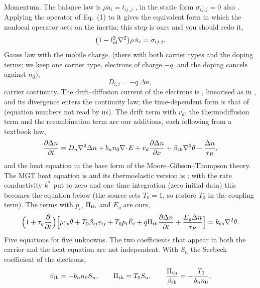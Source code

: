 \documentclass[11pt]{article}
\begin{document}
Momentum. The balance law is $\rho\ddot u_i=t_{ij,j}$ \cite[Eq.\ (3.3)]{Quintanilla2019}, in the static form $\sigma_{ij,j}=0$ also \cite[Eq.\ (4)]{Zhu2023}. Applying the operator of Eq.~(1) to it gives the equivalent form in which the nonlocal operator acts on the inertia; this step is ours and you should redo it,
\begin{equation}
\bigl(1-l_{\rm nl}^2\nabla^2\bigr)\rho\,\ddot u_i=\sigma_{ij,j},
\end{equation}
Gauss law with the mobile charge, \cite[Eqs.\ (4)--(6)]{Zhu2023} (there with both carrier types and the doping terms; we keep one carrier type, electrons of charge $-q$, and the doping cancels against $n_0$),
\begin{equation}
D_{i,i}=-q\,\Delta n ,
\end{equation}
carrier continuity. The drift--diffusion current of the electrons is \cite[Eq.\ (3)]{Zhu2023}, linearised as in \cite[Eq.\ (7)]{Zhu2023}, and its divergence enters the continuity law; the time-dependent form is that of \cite{YangZhou2005} (equation numbers not read by us). The drift term with $v_d$, the thermodiffusion term and the recombination term are our additions, each following from a textbook law,
\begin{equation}
\frac{\partial\Delta n}{\partial t}
=D_n\nabla^2\Delta n+b_nn_0\nabla\!\cdot\!E+v_d\frac{\partial\Delta n}{\partial x}
+\beta_{\rm th}\nabla^2\theta-\frac{\Delta n}{\tau_R},
\end{equation}
and the heat equation in the base form of the Moore--Gibson--Thompson theory. The MGT heat equation is \cite[Eq.\ (2.5)]{Quintanilla2019} and its thermoelastic version is \cite[Eq.\ (3.5)]{Quintanilla2019}; with the rate conductivity $k^*$ put to zero and one time integration (zero initial data) this becomes the equation below (the source sets $T_0=1$, so restore $T_0$ in the coupling term). The terms with $p_i$, $\Pi_{\rm th}$ and $E_g$ are ours,
\begin{equation}
\Bigl(1+\tau_q\frac{\partial}{\partial t}\Bigr)
\Bigl[\rho c_p\dot\theta+T_0\beta_{ij}\dot\varepsilon_{ij}+T_0p_i\dot E_i
+q\Pi_{\rm th}\frac{\partial\Delta n}{\partial t}+\frac{E_g\Delta n}{\tau_R}\Bigr]
=k_{\rm th}\nabla^2\theta .
\end{equation}
Five equations for five unknowns. The two coefficients that appear in both the carrier and the heat
equation are not independent. With $S_n$ the Seebeck coefficient of the electrons,
\begin{equation}
\beta_{\rm th}=-b_nn_0S_n,\qquad \Pi_{\rm th}=T_0S_n,\qquad
\frac{\Pi_{\rm th}}{\beta_{\rm th}}=-\frac{T_0}{b_nn_0},
\end{equation}
\end{document}

